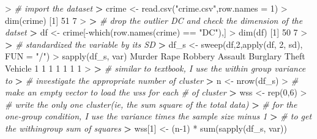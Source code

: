 \documentclass[
]{article}
\newenvironment{Shaded}{\begin{snugshade}}{\end{snugshade}}
\newcommand{\AttributeTok}[1]{\textcolor[rgb]{0.77,0.63,0.00}{#1}}
\newcommand{\CommentTok}[1]{\textcolor[rgb]{0.56,0.35,0.01}{\textit{#1}}}
\newcommand{\DecValTok}[1]{\textcolor[rgb]{0.00,0.00,0.81}{#1}}
\newcommand{\ErrorTok}[1]{\textcolor[rgb]{0.64,0.00,0.00}{\textbf{#1}}}
\newcommand{\FunctionTok}[1]{\textcolor[rgb]{0.00,0.00,0.00}{#1}}
\newcommand{\NormalTok}[1]{#1}
\newcommand{\OtherTok}[1]{\textcolor[rgb]{0.56,0.35,0.01}{#1}}
\newcommand{\SpecialCharTok}[1]{\textcolor[rgb]{0.00,0.00,0.00}{#1}}
\newcommand{\StringTok}[1]{\textcolor[rgb]{0.31,0.60,0.02}{#1}}
\begin{document}
\begin{Shaded}
\begin{Highlighting}[]
\SpecialCharTok{\textgreater{}} \CommentTok{\# import the dataset}
\ErrorTok{\textgreater{}}\NormalTok{ crime }\OtherTok{\textless{}{-}} \FunctionTok{read.csv}\NormalTok{(}\StringTok{"crime.csv"}\NormalTok{,}\AttributeTok{row.names =} \DecValTok{1}\NormalTok{)}
\SpecialCharTok{\textgreater{}} \FunctionTok{dim}\NormalTok{(crime)}
\NormalTok{[}\DecValTok{1}\NormalTok{] }\DecValTok{51}  \DecValTok{7}
\SpecialCharTok{\textgreater{}} 
\ErrorTok{\textgreater{}} \CommentTok{\# drop the outlier DC and check the dimension of the datset}
\ErrorTok{\textgreater{}}\NormalTok{ df }\OtherTok{\textless{}{-}}\NormalTok{ crime[}\SpecialCharTok{{-}}\FunctionTok{which}\NormalTok{(}\FunctionTok{row.names}\NormalTok{(crime) }\SpecialCharTok{==} \StringTok{"DC"}\NormalTok{),]}
\SpecialCharTok{\textgreater{}} \FunctionTok{dim}\NormalTok{(df)}
\NormalTok{[}\DecValTok{1}\NormalTok{] }\DecValTok{50}  \DecValTok{7}
\SpecialCharTok{\textgreater{}} 
\ErrorTok{\textgreater{}} \CommentTok{\# standardized the variable by its SD}
\ErrorTok{\textgreater{}}\NormalTok{ df\_s }\OtherTok{\textless{}{-}} \FunctionTok{sweep}\NormalTok{(df,}\DecValTok{2}\NormalTok{,}\FunctionTok{apply}\NormalTok{(df, }\DecValTok{2}\NormalTok{, sd), }\AttributeTok{FUN =} \StringTok{"/"}\NormalTok{)}
\SpecialCharTok{\textgreater{}} \FunctionTok{sapply}\NormalTok{(df\_s, var)}
\NormalTok{  Murder     Rape  Robbery  Assault Burglary    Theft  Vehicle }
       \DecValTok{1}        \DecValTok{1}        \DecValTok{1}        \DecValTok{1}        \DecValTok{1}        \DecValTok{1}        \DecValTok{1} 
\SpecialCharTok{\textgreater{}} 
\ErrorTok{\textgreater{}} \CommentTok{\# similar to textbook, I use the within group variance to }
\ErrorTok{\textgreater{}} \CommentTok{\# investigate the appropriate number of cluster}
\ErrorTok{\textgreater{}}\NormalTok{ n }\OtherTok{\textless{}{-}} \FunctionTok{nrow}\NormalTok{(df\_s)}
\SpecialCharTok{\textgreater{}} \CommentTok{\# make an empty vector to load the wss for each \# of cluster}
\ErrorTok{\textgreater{}}\NormalTok{ wss }\OtherTok{\textless{}{-}} \FunctionTok{rep}\NormalTok{(}\DecValTok{0}\NormalTok{,}\DecValTok{6}\NormalTok{)}
\SpecialCharTok{\textgreater{}} \CommentTok{\# write the only one cluster(ie, the sum square of the total data)}
\ErrorTok{\textgreater{}} \CommentTok{\# for the one{-}group condition, I use the variance times the sample size minus 1}
\ErrorTok{\textgreater{}} \CommentTok{\# to get the withingroup sum of squares}
\ErrorTok{\textgreater{}}\NormalTok{ wss[}\DecValTok{1}\NormalTok{] }\OtherTok{\textless{}{-}}\NormalTok{ (n}\DecValTok{{-}1}\NormalTok{) }\SpecialCharTok{*} \FunctionTok{sum}\NormalTok{(}\FunctionTok{sapply}\NormalTok{(df\_s, var))}

\end{Highlighting}
\end{Shaded}
\end{document}
